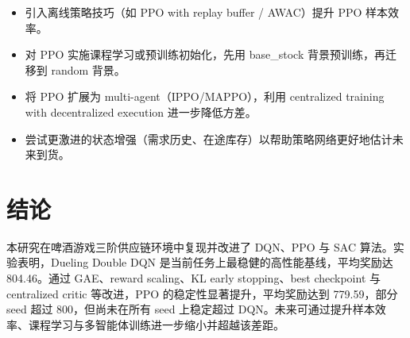 \documentclass{article}
\begin{document}
\begin{itemize}[leftmargin=2em]
  \item 引入离线策略技巧（如 PPO with replay buffer / AWAC）提升 PPO 样本效率。
  \item 对 PPO 实施课程学习或预训练初始化，先用 base\_stock 背景预训练，再迁移到 random 背景。
  \item 将 PPO 扩展为 multi-agent（IPPO/MAPPO），利用 centralized training with decentralized execution 进一步降低方差。
  \item 尝试更激进的状态增强（需求历史、在途库存）以帮助策略网络更好地估计未来到货。
\end{itemize}

\section{结论}

本研究在啤酒游戏三阶供应链环境中复现并改进了 DQN、PPO 与 SAC 算法。实验表明，Dueling Double DQN 是当前任务上最稳健的高性能基线，平均奖励达 804.46。通过 GAE、reward scaling、KL early stopping、best checkpoint 与 centralized critic 等改进，PPO 的稳定性显著提升，平均奖励达到 779.59，部分 seed 超过 800，但尚未在所有 seed 上稳定超过 DQN。未来可通过提升样本效率、课程学习与多智能体训练进一步缩小并超越该差距。


\end{document}
